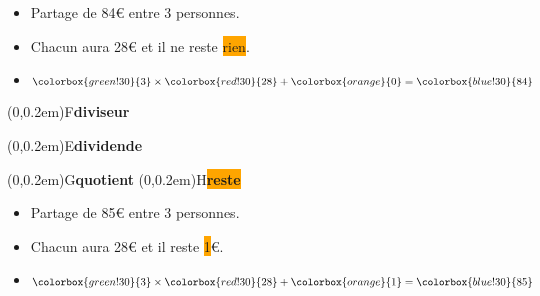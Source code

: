 \begin{changemargin}{-10mm}{-10mm}
\begin{exemples*1}
		\begin{minipage}{0.5\linewidth}
			\begin{itemize}
				\item Partage de 84\euro{} entre 3 personnes.
				\item Chacun aura \colorbox{red!30}{28}\euro{} et il ne reste \colorbox{orange}{rien}.
				\item $\colorbox{green!30}{3}\times \colorbox{red!30}{28}+ \colorbox{orange}{0}=\colorbox{blue!30}{84}$
			\end{itemize}
		\end{minipage}
		\begin{minipage}{0.5\linewidth}
			\begin{center}
				\qquad
				\begin{minipage}[b]{2cm}
					\pnode(0,0.2em){F}{\colorbox{green!30}{\textbf{diviseur}}}
					\par
					\pnode(0,0.2em){E}{\colorbox{blue!30}{\textbf{dividende}}}
					\par
					\pnode(0,0.2em){G}{\colorbox{red!30}{\textbf{quotient}}}
					\pnode(0,0.2em){H}{\colorbox{orange}{\textbf{reste}}}
				\end{minipage}
			\end{center}
		\end{minipage}	
		\par\medskip	
		\begin{minipage}{0.5\linewidth}
			\begin{itemize}
				\item Partage de 85\euro{} entre 3 personnes.
				\item Chacun aura \colorbox{red!30}{28}\euro{} et il reste \colorbox{orange}{1}\euro{}.
				\item $\colorbox{green!30}{3}\times \colorbox{red!30}{28}+ \colorbox{orange}{1}=\colorbox{blue!30}{85}$
			\end{itemize}
		\end{minipage}
		\begin{minipage}{0.5\linewidth}
			\begin{center}

\end{center}
\end{minipage}
\end{exemples*1}
\end{changemargin}
